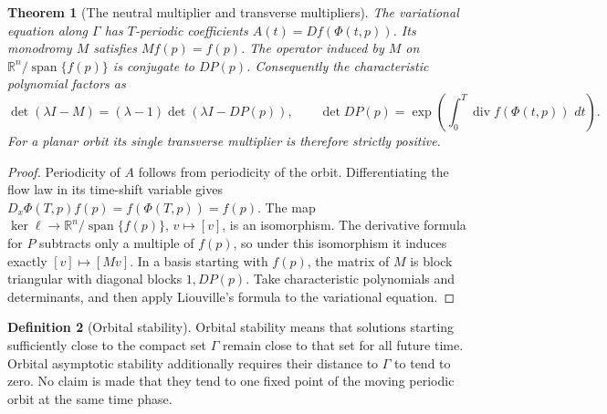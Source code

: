 \documentclass[11pt,oneside]{book}
\newtheorem{theorem}{Theorem}[chapter]
\theoremstyle{definition}
\newtheorem{definition}[theorem]{Definition}
\theoremstyle{remark}\newtheorem{remark}[theorem]{Remark}
\newcommand{\R}{\mathbb R}\newcommand{\C}{\mathbb C}
\newcommand{\dd}{\,d}\newcommand{\id}{\operatorname{id}}
\begin{document}
\begin{theorem}[The neutral multiplier and transverse multipliers]\label{d13:14:multipliers}
The variational equation along \(\Gamma\) has \(T\)-periodic coefficients
\(A(t)=Df(\Phi(t,p))\). Its monodromy \(M\) satisfies \(Mf(p)=f(p)\).
The operator induced by \(M\) on
\(\R^n/\operatorname{span}\{f(p)\}\) is conjugate to \(DP(p)\).
Consequently the characteristic polynomial factors as
\[
 \det(\lambda I-M)=(\lambda-1)\det(\lambda I-DP(p)),
 \qquad
 \det DP(p)=\exp\left(\int_0^T\operatorname{div}f(\Phi(t,p))\,\dd t\right).
\]
For a planar orbit its single transverse multiplier is therefore
strictly positive.
\end{theorem}
\begin{proof}
Periodicity of \(A\) follows from periodicity of the orbit.
Differentiating the flow law in its time-shift variable gives
\(D_x\Phi(T,p)f(p)=f(\Phi(T,p))=f(p)\).
The map \(\ker\ell\to\R^n/\operatorname{span}\{f(p)\}\),
\(v\mapsto[v]\), is an isomorphism.
The derivative formula for \(P\) subtracts only a multiple of \(f(p)\),
so under this isomorphism it induces exactly \([v]\mapsto[Mv]\).
In a basis starting with \(f(p)\), the matrix of \(M\) is block
triangular with diagonal blocks \(1,DP(p)\).
Take characteristic polynomials and determinants, and then apply
Liouville's formula to the variational equation.
\end{proof}

\begin{definition}[Orbital stability]\label{d13:14:orbital-definition}
Orbital stability means that solutions starting sufficiently close to
the compact set \(\Gamma\) remain close to that set for all future time.
Orbital asymptotic stability additionally requires their distance to
\(\Gamma\) to tend to zero. No claim is made that they tend to one
fixed point of the moving periodic orbit at the same time phase.
\end{definition}
\end{document}
